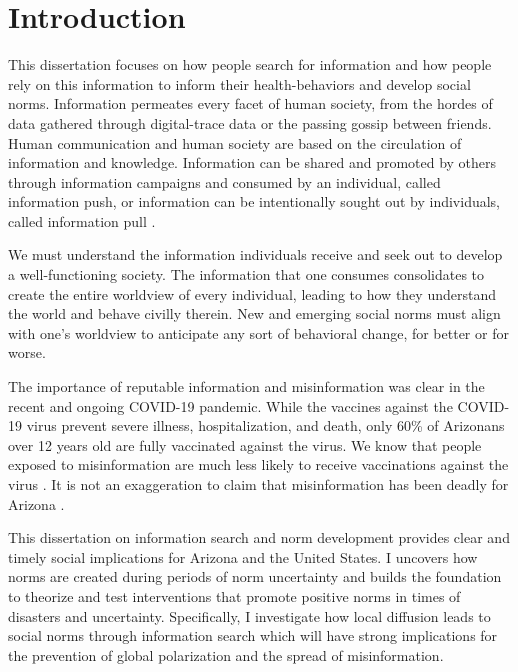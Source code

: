 \hypertarget{intro}{%
\chapter{Introduction}\label{intro}}



This dissertation focuses on how people search for information and how people
rely on this information to inform their health-behaviors and develop social
norms. Information permeates every facet of human society, from the hordes of
data gathered through digital-trace data or the passing gossip between friends.
Human communication and human society are based on the circulation of
information and knowledge. Information can be shared and promoted by others
through information campaigns and consumed by an individual, called information
push, or information can be intentionally sought out by individuals, 
called information pull \citep{cybenkoFoundationsInformationPush1999}.

We must understand the information individuals receive and seek out 
to develop a well-functioning society. The information that
one consumes consolidates to create the entire worldview of every individual,
leading to how they understand the world and behave civilly therein. New and
emerging social norms must align with one's worldview to anticipate any sort of 
behavioral change, for better or for worse. 

The importance of reputable information and misinformation was clear
in the recent and ongoing COVID-19 pandemic. While the vaccines against the
COVID-19 virus prevent severe illness, hospitalization, and death, only 60\% of
Arizonans over 12 years old are fully vaccinated against the virus. We know that
people exposed to misinformation are much less likely to receive vaccinations
against the virus \citep{loombaMeasuringImpactCOVID192021}. It is not an
exaggeration to claim that misinformation has been deadly for Arizona
\citep{pathakInfodemicsCOVID19Role2020, greene_murphy21}.

This dissertation on information search and norm development provides clear and
timely social implications for Arizona and the United States. I
uncovers how norms are created during periods of norm uncertainty and builds the
foundation to theorize and test interventions that promote positive norms in
times of disasters and uncertainty. Specifically, I investigate how local
diffusion leads to social norms through information search which will have
strong implications for the prevention of global polarization and the spread of
misinformation.

